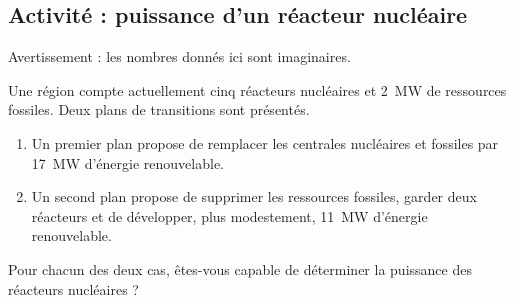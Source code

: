 
\subsection*{Activité : puissance d'un réacteur nucléaire}

Avertissement : les nombres donnés ici sont imaginaires.

Une région compte actuellement cinq réacteurs nucléaires et \SI{2}{\mega\watt} de ressources fossiles. Deux plans de transitions sont présentés.
\begin{enumerate}
    \item
        Un premier plan propose de remplacer les centrales nucléaires et fossiles par \SI{17}{\mega\watt} d'énergie renouvelable.
    \item
        Un second plan propose de supprimer les ressources fossiles, garder deux réacteurs et de développer, plus modestement, \SI{11}{\mega\watt} d'énergie renouvelable.
\end{enumerate}

Pour chacun des deux cas, êtes-vous capable de déterminer la puissance des réacteurs nucléaires ?
